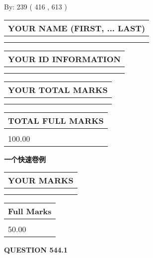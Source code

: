 \documentclass{ctexart}
\begin{document}
   
\hspace{1.0in} By: 
 239 ( 416 ,  613 )
   
   
   
   
\newpage 
\setcounter{page}{ 
   544001 } 
   
   
   
   
\noindent\begin{tabular}{|l|}
\hline
YOUR NAME (FIRST, ... LAST)  \\
\hline
 \\ 
 \\ 
\hline
\end{tabular}
\hspace{0.05in} \begin{tabular}{|l|}
\hline
 YOUR   ID   INFORMATION  \\
\hline
 \\ 
 \\ 
\hline
\end{tabular}
   
   
\vspace{0.2in}\noindent\begin{tabular}{|l|}
\hline
YOUR TOTAL MARKS  \\
\hline
 \\ 
 \\ 
\hline
\end{tabular}
\hspace{0.05in} \begin{tabular}{|l|}
\hline
TOTAL FULL MARKS  \\
\hline
 \\ 
100.00 \\
\hline
\end{tabular}
   
   
 \vspace{0.2in}
{\LARGE {\textbf{ 一个快速卷例}}}
   
   
  
\vspace{0.2in}
  
\noindent\begin{tabular}{|l|}
\hline
 YOUR MARKS  \\
\hline
 \\ 
 \\ 
\hline
\end{tabular}
\hspace{0.05in} \begin{tabular}{|l|}
\hline
 Full Marks  \\
\hline
 \\ 
50.00 \\
\hline
\end{tabular}
{\textbf{\Large{QUESTION
544.1 
}}}
  
\end{document}
